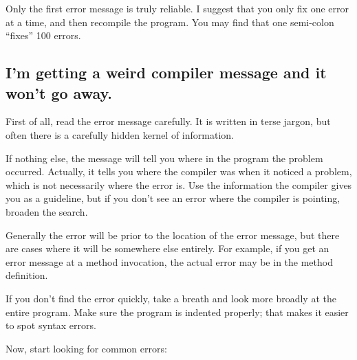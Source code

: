 \documentclass[12pt]{book}
\theoremstyle{definition}
\begin{document}
Only the first error message is truly reliable.  I suggest
that you only fix one error at a time, and then recompile the
program.  You may find that one semi-colon ``fixes'' 100 errors.


\subsection*{I'm getting a weird compiler message and it
won't go away.}

First of all, read the error message carefully.  It is written in
terse jargon, but often there is a carefully hidden kernel of
information.

If nothing else, the message will tell you where in the program the
problem occurred.  Actually, it tells you where the compiler was
when it noticed a problem, which is not necessarily where the error
is.  Use the information the compiler gives you as a guideline,
but if you don't see an error where the compiler is pointing,
broaden the search.

Generally the error will be prior to the location of the error
message, but there are cases where it will be somewhere else
entirely.  For example, if you get an error message at a method
invocation, the actual error may be in the method definition.

If you don't find the error quickly, take a breath and look more
broadly at the entire program.  Make sure the program is indented
properly; that makes it easier to spot syntax errors.

Now, start looking for common errors:
\end{document}
